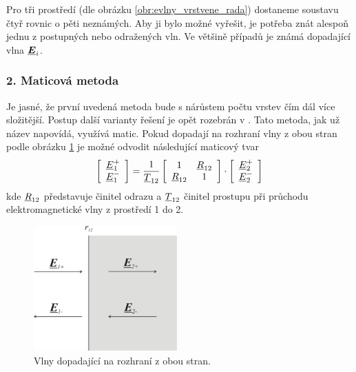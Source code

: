 Pro tři prostředí (dle obrázku \ref{obr:evlny_vrstvene_rada}) dostaneme soustavu čtyř rovnic o pěti neznámých. Aby ji bylo možné vyřešit, je potřeba znát alespoň jednu z postupných nebo odražených vln. Ve většině případů je známá dopadající vlna $\mbox{\underline{\boldmath$E$}}_{i}$. 

\subsubsection*{2. Maticová metoda}
Je jasné, že první uvedená metoda bude s nárůstem počtu vrstev čím dál více složitější. Postup další varianty řešení je opět rozebrán v \cite[str. 105]{emp}. Tato metoda, jak už název napovídá, využívá matic. Pokud dopadají na rozhraní vlny z obou stran podle obrázku \ref{obr:evlny_maticova_metoda1} je možné odvodit následující maticový tvar
\begin{equation}
\left[ \begin{array}{c}
{\underline{E}}_{1}^{+} \\
{\underline{E}}_{1}^{-} \\
\end{array} \right]
= 
\frac{1}{{\underline{T}}_ {12}}
\left[ \begin{array}{cc}
1 & {\underline{R}}_{12} \\
{\underline{R}}_{12} & 1 \\
\end{array} \right]
\cdot
\left[ \begin{array}{c}
{\underline{E}}_{2}^{+} \\
{\underline{E}}_{2}^{-} \\
\end{array} \right]
\label{rce:evlny_maticova_rozhrani}
\end{equation}
kde ${\underline{R}}_{12}$ představuje činitel odrazu a ${\underline{T}}_ {12}$ činitel prostupu při průchodu elektromagnetické vlny z prostředí 1 do 2. 
\begin{figure}[!h]
	\centering
	\includegraphics[width=5.5cm]{evlny_maticova_metoda1.png}
	\caption{Vlny dopadající na rozhraní z obou stran.\cite{emp}}
	\label{obr:evlny_maticova_metoda1}
\end{figure}

